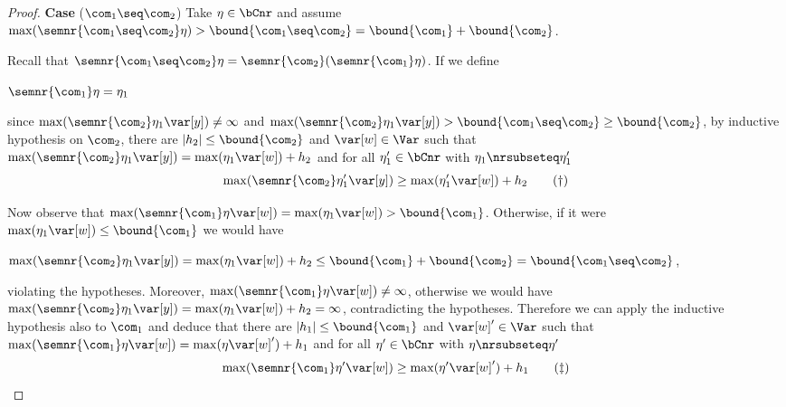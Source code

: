 \begin{proof}
  
  \medskip
  
  \noindent
  \textbf{Case} (\(\com_1 \seq \com_2\))
  Take \(\eta \in \bCnr\) and assume
  \(\max(\semnr{\com_1 \seq \com_2}\eta) > \bound{\com_1 \seq \com_2} =
  \bound{\com_1} + \bound{\com_2}\).
  
  Recall that
  \(\semnr{\com_1 \seq \com_2} \eta = \semnr{\com_2}(\semnr{\com_1}\eta)\).
  If we define
  \begin{center}
    \(\semnr{\com_1} \eta = \eta_1\)
  \end{center}
  since \(\max(\semnr{\com_2} \eta_1 \var[y]) \neq \infty\) and
  \(\max(\semnr{\com_2} \eta_1 \var[y]) > \bound{\com_1 \seq \com_2}
  \geq \bound{\com_2}\), by inductive hypothesis on \(\com_2\), there
  are \(|h_2| \leq \bound{\com_2}\) and \(\var[w] \in \Var\) such that
  \(\max(\semnr{\com_2} \eta_1 \var[y]) = \max(\eta_1 \var[w]) + h_2\)
  and for all \(\eta_1' \in \bCnr\) with
  \(\eta_1 \nrsubseteq \eta_1'\)
  \begin{equation}
    \label{eq:seq2nr}
    \max(\semnr{\com_2} \eta_1' \var[y]) \geq \max(\eta_1' \var[w]) + h_2
    \tag{\dag}
  \end{equation}
  
  Now observe that
  \(\max(\semnr{\com_1}\eta \var[w]) = \max(\eta_1 \var[w]) >
  \bound{\com_1}\). Otherwise, if it were \(\max(\eta_1 \var[w]) \leq
  \bound{\com_1}\) we would have
  \begin{center}
    \(\max(\semnr{\com_2}\eta_1 \var[y]) = \max(\eta_1 \var[w]) + h_2 \leq
    \bound{\com_1} + \bound{\com_2} = \bound{\com_1 \seq \com_2}\),
  \end{center}
  violating the hypotheses. Moreover,
  \(\max(\semnr{\com_1}\eta \var[w]) \neq \infty\), otherwise we would
  have
  \(\max(\semnr{\com_2} \eta_1 \var[y]) = \max(\eta_1 \var[w]) + h_2 =
  \infty\), contradicting the hypotheses.  Therefore we can apply the
  inductive hypothesis also to \(\com_1\) and deduce that there are
  \(|h_1| \leq \bound{\com_1}\) and \(\var[w]' \in \Var\) such that
  \(\max(\semnr{\com_1} \eta \var[w]) = \max(\eta \var[w]') + h_1\)
  and for all \(\eta' \in \bCnr\) with \(\eta \nrsubseteq \eta'\)
  \begin{equation}
    \label{eq:seq1nr}
    \max(\semnr{\com_1} \eta' \var[w]) \geq \max(\eta' \var[w]') + h_1
    \tag{\ddag}
  \end{equation}


\end{proof}
